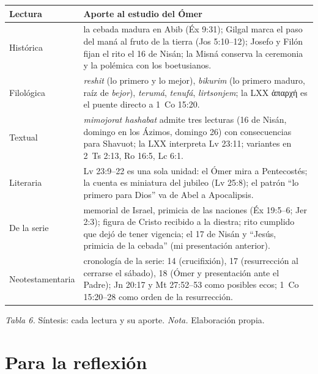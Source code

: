 \documentclass[11pt,letterpaper]{article}
\newcommand{\grc}[1]{\foreignlanguage{ancientgreek}{#1}}
\begin{document}
\begin{center}\begin{minipage}{\linewidth}\centering\footnotesize\renewcommand{\arraystretch}{1.15}
\begin{tabular}{@{}L{3.2cm}L{11.2cm}@{}}
\toprule
\textbf{Lectura} & \textbf{Aporte al estudio del Ómer} \\ \midrule
Histórica & la cebada madura en Abib (Éx 9:31); Gilgal marca el paso del maná al fruto de la tierra (Jos 5:10--12); Josefo y Filón fijan el rito el 16 de Nisán; la Misná conserva la ceremonia y la polémica con los boetusianos. \\
Filológica & \emph{reshit} (lo primero y lo mejor), \emph{bikurim} (lo primero maduro, raíz de \emph{bejor}), \emph{terumá}, \emph{tenufá}, \emph{lirtsonjem}; la LXX \grc{ἀπαρχή} es el puente directo a 1~Co 15:20. \\
Textual & \emph{mimojorat hashabat} admite tres lecturas (16 de Nisán, domingo en los Ázimos, domingo 26) con consecuencias para Shavuot; la LXX interpreta Lv 23:11; variantes en 2~Ts 2:13, Ro 16:5, Lc 6:1. \\
Literaria & Lv 23:9--22 es una sola unidad: el Ómer mira a Pentecostés; la cuenta es miniatura del jubileo (Lv 25:8); el patrón ``lo primero para Dios'' va de Abel a Apocalipsis. \\
De la serie & memorial de Israel, primicia de las naciones (Éx 19:5--6; Jer 2:3); figura de Cristo recibido a la diestra; rito cumplido que dejó de tener vigencia; el 17 de Nisán y ``Jesús, primicia de la cebada'' (mi presentación anterior). \\
Neotestamentaria & cronología de la serie: 14 (crucifixión), 17 (resurrección al cerrarse el sábado), 18 (Ómer y presentación ante el Padre); Jn 20:17 y Mt 27:52--53 como posibles ecos; 1~Co 15:20--28 como orden de la resurrección. \\
\bottomrule
\end{tabular}\par
{\footnotesize\color{sepia}\textit{Tabla 6.} Síntesis: cada lectura y su aporte. \textit{Nota.} Elaboración propia.}
\end{minipage}\end{center}

\section{Para la reflexión}
\end{document}
